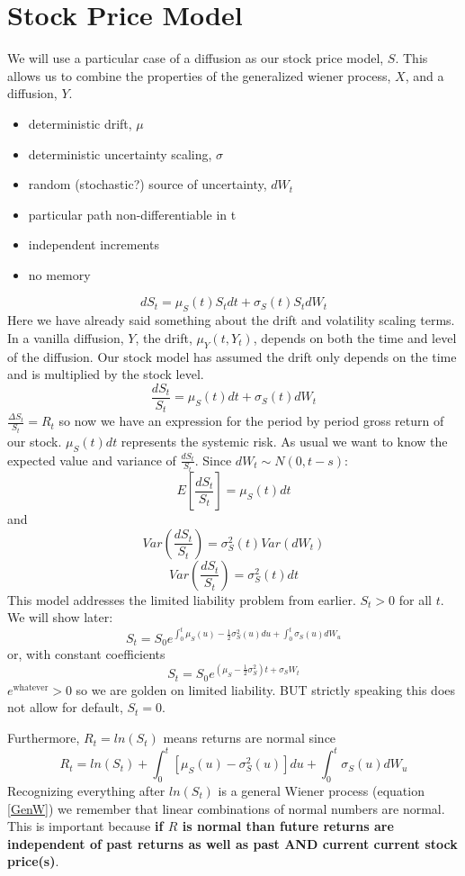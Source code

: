 
\section{Stock Price Model}

We will use a particular case of a diffusion as our stock price model, $S$.
This allows us to combine the properties of the generalized wiener process,
$X$, and a diffusion, $Y$.
\begin{itemize}
    \item deterministic drift, $\mu$
    \item deterministic uncertainty scaling, $\sigma$
    \item random (stochastic?) source of uncertainty, $dW_t$
    \item particular path non-differentiable in t
    \item independent increments
    \item no memory
\end{itemize}

\[dS_t=\mu_S(t)S_tdt+\sigma_S(t)S_tdW_t\]
Here we have already said something about the drift and volatility scaling
terms. In a vanilla diffusion, $Y$, the drift, $\mu_Y(t, Y_t)$, depends on both
the time and level of the diffusion. Our stock model has assumed the drift only
depends on the time and is multiplied by the stock level.
\[\frac{dS_t}{S_t}=\mu_S(t)dt+\sigma_S(t)dW_t\]
$\frac{\Delta S_t}{S_t}=R_t$ so now we have an expression for the period by
period gross return of our stock. $\mu_S(t)dt$ represents the systemic risk. As
usual we want to know the expected value and variance of $\frac{dS_t}{S_t}$.
Since $dW_t \sim N(0,t-s)$:
\[E \left[ \frac{dS_t}{S_t} \right] = \mu_S(t)dt\]
and
\[Var \left( \frac{dS_t}{S_t} \right) = \sigma_S^2(t)Var(dW_t)\]
\[Var \left( \frac{dS_t}{S_t} \right) = \sigma_S^2(t)dt\]
This model addresses the limited liability problem from earlier. $S_t>0$ for
all $t$. We will show later:
\begin{equation} \label{S}
    S_t=S_0e^{\int_0^t\mu_S(u)-\frac{1}{2}\sigma_S^2(u)du+
    \int_0^t\sigma_S(u)dW_u}
\end{equation}
or, with constant coefficients
\begin{equation} \label{SConsCoef}
    S_t=S_0e^{(\mu_S-\frac{1}{2}\sigma_S^2)t+\sigma_SW_t}
\end{equation}
$e^{\text{whatever}} > 0$ so we are golden on limited liability. BUT strictly
speaking this does not allow for default, $S_t=0$.

Furthermore, $R_t=ln(S_t)$ means returns are normal since
\[
    R_t=ln(S_t)+\int_0^t \left[ \mu_S(u)-\sigma_S^2(u) \right] du +
    \int_0^t \sigma_S(u)dW_u
\]
Recognizing everything after $ln(S_t)$ is a general Wiener process (equation
\ref{GenW}) we remember that linear combinations of normal numbers are normal.
This is important because
\textbf{if $R$ is normal than future returns are independent of past returns
  as well as past AND current current stock price(s)}.
